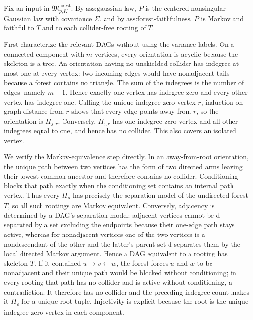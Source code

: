 Fix an input in \(\mathfrak M_{p,K}^{\mathrm{forest}}\).  By \(\text{ass:gaussian-law}\), \(P\) is the centered nonsingular Gaussian law with covariance \(\Sigma\), and by \(\text{ass:forest-faithfulness}\), \(P\) is Markov and faithful to \(T\) and to each collider-free rooting of \(T\).

First characterize the relevant DAGs without using the variance labels.  On a connected component with \(m\) vertices, every orientation is acyclic because the skeleton is a tree.  An orientation having no unshielded collider has indegree at most one at every vertex: two incoming edges would have nonadjacent tails because a forest contains no triangle.  The sum of the indegrees is the number of edges, namely \(m-1\).  Hence exactly one vertex has indegree zero and every other vertex has indegree one.  Calling the unique indegree-zero vertex \(r\), induction on graph distance from \(r\) shows that every edge points away from \(r\), so the orientation is \(H_{j,r}\).  Conversely, \(H_{j,r}\) has one indegree-zero vertex and all other indegrees equal to one, and hence has no collider.  This also covers an isolated vertex.

We verify the Markov-equivalence step directly.  In an away-from-root orientation, the unique path between two vertices has the form of two directed arms leaving their lowest common ancestor and therefore contains no collider.  Conditioning blocks that path exactly when the conditioning set contains an internal path vertex.  Thus every \(H_\rho\) has precisely the separation model of the undirected forest \(T\), so all such rootings are Markov equivalent.  Conversely, adjacency is determined by a DAG's separation model: adjacent vertices cannot be d-separated by a set excluding the endpoints because their one-edge path stays active, whereas for nonadjacent vertices one of the two vertices is a nondescendant of the other and the latter's parent set d-separates them by the local directed Markov argument.  Hence a DAG equivalent to a rooting has skeleton \(T\).  If it contained \(u\to v\leftarrow w\), the forest forces \(u\) and \(w\) to be nonadjacent and their unique path would be blocked without conditioning; in every rooting that path has no collider and is active without conditioning, a contradiction.  It therefore has no collider and the preceding indegree count makes it \(H_\rho\) for a unique root tuple.  Injectivity is explicit because the root is the unique indegree-zero vertex in each component.

